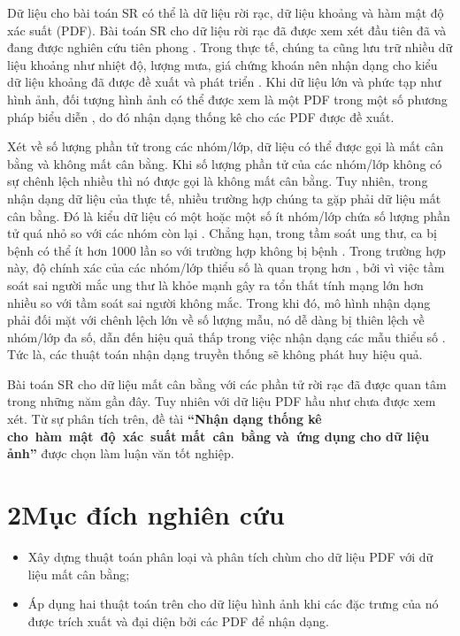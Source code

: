 \documentclass[a4paper,oneside]{book} %
\theoremstyle{plain}
\theoremstyle{plain}
\theoremstyle{nonumberplain}
\begin{document}
Dữ liệu cho bài toán SR có thể là dữ liệu rời rạc, dữ liệu khoảng và hàm mật độ xác suất (PDF). Bài toán SR cho dữ liệu rời rạc đã được xem xét đầu tiên đã và đang được nghiên cứu tiên phong \cite{zha2025data,cortes1995support,bezdek1984fcm}. Trong thực tế, chúng ta cũng lưu trữ nhiều dữ liệu khoảng như nhiệt độ, lượng mưa, giá chứng khoán nên nhận dạng cho kiểu dữ liệu khoảng đã được đề xuất và phát triển \cite{maia2011holt}. Khi dữ liệu lớn và phức tạp như hình ảnh, đối tượng hình ảnh có thể được xem là một PDF trong một số phương pháp biểu diễn \cite{nguyen2024new}, do đó nhận dạng thống kê cho các PDF được đề xuất. 

Xét về số lượng phần tử trong các nhóm/lớp, dữ liệu có thể được gọi là mất cân bằng và không mất cân bằng. Khi số lượng phần tử của các nhóm/lớp không có sự chênh lệch nhiều thì nó được gọi là không mất cân bằng. Tuy nhiên, trong nhận dạng dữ liệu của thực tế, nhiều trường hợp chúng ta gặp phải dữ liệu mất cân bằng.  Đó là kiểu dữ liệu có một hoặc một số ít nhóm/lớp chứa số lượng phần tử quá nhỏ so với các nhóm còn lại \cite{hu2024gat}. Chẳng hạn, trong tầm soát  ung thư, ca bị bệnh có thể ít hơn 1000 lần so với trường hợp không bị bệnh \cite{tang2008svms}. Trong trường hợp này, độ chính xác của các nhóm/lớp thiểu số là quan trọng hơn \cite{hu2024gat}, bởi vì việc tầm soát sai người mắc ung thư là khỏe mạnh gây ra tổn thất tính mạng lớn hơn nhiều so với tầm soát sai người không mắc. Trong khi đó, mô hình nhận dạng phải đối mặt với chênh lệch lớn về số lượng mẫu, nó dễ dàng bị thiên lệch về nhóm/lớp đa số, dẫn đến hiệu quả thấp trong việc nhận dạng các mẫu thiểu số \cite{nguyen2009learning}. Tức là, các thuật toán nhận dạng  truyền thống sẽ không phát huy hiệu quả.

Bài toán SR cho dữ liệu mất cân bằng với các phần tử rời rạc đã được quan tâm trong những năm gần đây. Tuy nhiên với dữ liệu PDF hầu như chưa được xem xét. Từ sự phân tích trên, đề tài {\bf ``Nhận dạng thống kê cho~hàm~mật~độ~xác~suất mất~cân~bằng và~ứng dụng cho dữ liệu ảnh''} được chọn làm luận văn tốt nghiệp. 


\section*{2\quad Mục đích nghiên cứu}

\begin{itemize}
	\item[--] Xây dựng thuật toán phân loại và phân tích chùm cho dữ liệu PDF với dữ liệu mất cân bằng;
	\item[--] Áp dụng hai thuật toán trên cho dữ liệu hình ảnh khi các đặc trưng của nó được trích xuất và đại diện bởi các PDF để nhận dạng. 
\end{itemize}
\end{document}
